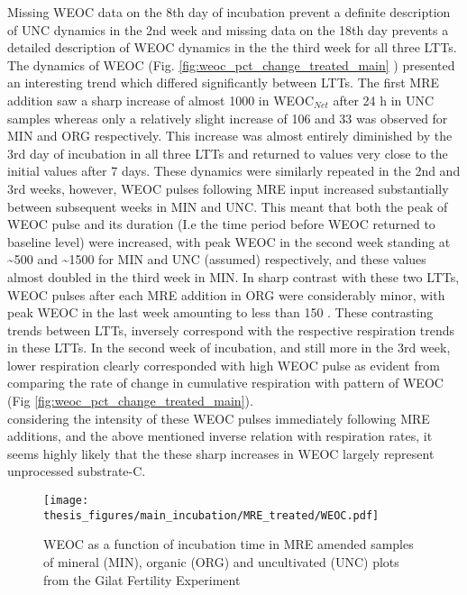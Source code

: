 \documentclass[12pt]{report}
\begin{document}
		Missing WEOC data on the 8th day of incubation prevent a definite description of UNC dynamics in the 2nd week and missing data on the 18th day prevents a detailed description of WEOC dynamics in the the third week for all three LTTs. The dynamics of WEOC (Fig. \ref{fig:weoc_pct_change_treated_main} ) presented an interesting trend which differed significantly between LTTs. The first MRE addition saw a sharp increase of almost 1000 \genericunit in WEOC$_{Net}$ after 24 h in UNC samples whereas only a relatively slight increase of 106 and 33 \genericunit was observed for MIN and ORG respectively. This increase was almost entirely diminished by the 3rd day of incubation in all three LTTs and returned to values very close to the initial values after 7 days. These dynamics were similarly repeated in the 2nd and 3rd weeks, however, WEOC pulses following MRE input increased substantially between subsequent weeks in MIN and UNC. This meant that both the peak of WEOC pulse and its duration (I.e the time period before WEOC returned to baseline level) were increased, with peak WEOC in the second week standing at \~{}500 and \~{}1500 \genericunit for MIN and UNC (assumed) respectively, and these values almost doubled in the third week in MIN. In sharp contrast with these two LTTs, WEOC pulses after each MRE addition in ORG were considerably minor, with peak WEOC in the last week amounting to less than 150 \genericunit.
		These contrasting trends between LTTs, inversely correspond with the respective respiration trends in these LTTs. In the second week of incubation, and still more in the 3rd week, lower respiration clearly corresponded with high WEOC pulse as evident from comparing the rate of change in cumulative respiration with pattern of WEOC (Fig \ref{fig:weoc_pct_change_treated_main}).\\
		considering the intensity of these WEOC pulses immediately following MRE additions, and the above mentioned inverse relation with respiration rates, it seems highly likely that the these sharp increases in WEOC largely represent unprocessed substrate-C.
		\begin{figure}[H]
			\centering
			\texttt{[image: thesis\_figures/main\_incubation/MRE\_treated/WEOC.pdf]}
			\caption{WEOC as a function of incubation time in MRE amended samples of mineral (MIN), organic (ORG) and uncultivated (UNC) plots from the Gilat Fertility Experiment}
			\label{fig:weoc_treated_main}
		\end{figure}
		
\end{document}
